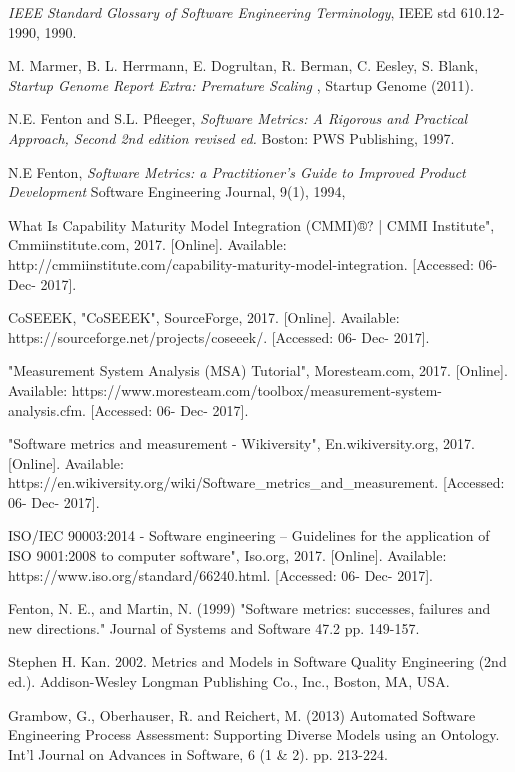 \documentclass{article}
\begin{document}
\begin{thebibliography}{1}

 { \em IEEE Standard Glossary of Software Engineering Terminology}, IEEE std 610.12-1990, 1990.

 M. Marmer, B. L. Herrmann, E. Dogrultan, R. Berman, C. Eesley, S. Blank, {\em Startup Genome Report Extra: Premature Scaling} , Startup Genome (2011).

 N.E. Fenton and S.L. Pfleeger, {\em Software Metrics: A Rigorous and Practical Approach, Second 2nd edition revised ed.} Boston: PWS Publishing, 1997.

 N.E Fenton, {\em Software Metrics: a Practitioner's Guide to Improved Product Development} Software Engineering Journal, 9(1), 1994,

 What Is Capability Maturity Model Integration (CMMI)®? | CMMI Institute", Cmmiinstitute.com, 2017. [Online]. Available: http://cmmiinstitute.com/capability-maturity-model-integration. [Accessed: 06- Dec- 2017].

 CoSEEEK, "CoSEEEK", SourceForge, 2017. [Online]. Available: https://sourceforge.net/projects/coseeek/. [Accessed: 06- Dec- 2017].

"Measurement System Analysis (MSA) Tutorial", Moresteam.com, 2017. [Online]. Available: https://www.moresteam.com/toolbox/measurement-system-analysis.cfm. [Accessed: 06- Dec- 2017].

 "Software metrics and measurement - Wikiversity", En.wikiversity.org, 2017. [Online]. Available: https://en.wikiversity.org/wiki/Software\_metrics\_and\_measurement. [Accessed: 06- Dec- 2017].

 ISO/IEC 90003:2014 - Software engineering -- Guidelines for the application of ISO 9001:2008 to computer software", Iso.org, 2017. [Online]. Available: https://www.iso.org/standard/66240.html. [Accessed: 06- Dec- 2017].

 Fenton, N. E., and Martin, N. (1999) "Software metrics: successes, failures and new directions." Journal of Systems and Software 47.2 pp. 149-157.

 Stephen H. Kan. 2002. Metrics and Models in Software Quality Engineering (2nd ed.). Addison-Wesley Longman Publishing Co., Inc., Boston, MA, USA.

 Grambow, G., Oberhauser, R. and Reichert, M. (2013) Automated Software Engineering Process Assessment: Supporting Diverse Models using an Ontology. Int'l Journal on Advances in Software, 6 (1 \& 2). pp. 213-224.


\end{thebibliography}
\end{document}

